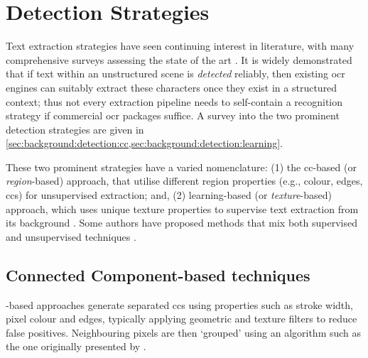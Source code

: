 \section{Detection Strategies}
\label{sec:background:detection_strategies}

Text extraction strategies have seen continuing interest in literature, with many comprehensive surveys assessing the state of the art \cite{Chen:2000ua, Jung:2004uwa, Zhang:2008vfa, Liang:2005uy, Jung:2004uw}. It is widely demonstrated that if text within an unstructured scene is \textit{detected} reliably, then existing \gls{ocr} engines can suitably extract these characters \citep{Smith:2007dc} once they exist in a structured context; thus not every extraction pipeline needs to self-contain a recognition strategy if commercial \gls{ocr} packages suffice. A survey into the two prominent detection strategies are given in \cref{sec:background:detection:cc,sec:background:detection:learning}.

These two prominent strategies have a varied nomenclature: (1) the \gls{cc}-based (or \textit{region}-based) approach, that utilise different region properties (e.g., colour, edges, \glspl{cc}) \citep{Jain:1998wd, Kim:1996tw, Liu:2006wh, Chen:2011ul, Li:2012wd, Zhang:2011cl, Shivakumara:2011dn, Epshtein:2010tj, Zhang:2010wa, Shivakumara:2010wu, Liu:2008tz, Subramanian:2007tf, Lee:2010vv, Sun:2010tg} for unsupervised extraction; and, (2) learning-based (or \textit{texture}-based) approach, which uses unique texture properties to supervise text extraction from its background \citep{Ye:2005wu,XiangrongChen:2004ha,Pan:2010cj,Gllavata:2004vq,Minetto:2010tg,Phan:2009bc,Lee:2003cn,Lienhart:2002ub,Li:2000uf,Wang:2009il,Dalal:2005jq,Hanif:2009tm,Tu:2003tg,Chen:2005wv}. Some authors have proposed methods that mix both supervised and unsupervised techniques \citep{Mutch:2006ub, Mairal:2008uw, Bengio:2006vb}.

\subsection{Connected Component-based techniques}
\label{sec:background:detection:cc}

-based approaches generate separated \glspl{cc} using properties such as stroke width, pixel colour and edges, typically applying geometric and texture filters to reduce false positives. Neighbouring pixels are then `grouped' using an algorithm such as the one originally presented by \citet{Horn:1986vc}. 

